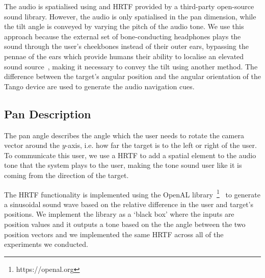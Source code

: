 \documentclass[format=sigconf, review=true, screen=true, anonymous=true]{acmart}
\begin{document}
The audio is spatialised using and HRTF provided by a third-party open-source sound library. However, the audio is only spatialised in the pan dimension, while the tilt angle is conveyed by varying the pitch of the audio tone. We use this approach because the external set of bone-conducting headphones plays the sound through the user's cheekbones instead of their outer ears, bypassing the pennae of the ears which provide humans their ability to localise an elevated sound source~\cite{roffler1968factors, algazi2001elevation}, making it necessary to convey the tilt using another method. The difference between the target's angular position and the angular orientation of the Tango device are used to generate the audio navigation cues. %

\subsection{Pan Description}

The pan angle describes the angle which the user needs to rotate the camera vector around the $y$-axis, i.e. how far the target is to the left or right of the user. To communicate this user, we use a HRTF to add a spatial element to the audio tone that the system plays to the user, making the tone sound user like it is coming from the direction of the target. 

The HRTF functionality is implemented using the OpenAL library~\footnote{https://openal.org}~\cite{hiebert2005openal} to generate a sinusoidal sound wave based on the relative difference in the user and target's positions. We implement the library as a `black box' where the inputs are position values and it outputs a tone based on the the angle between the two position vectors and we implemented the same HRTF across all of the experiments we conducted.  
\end{document}
